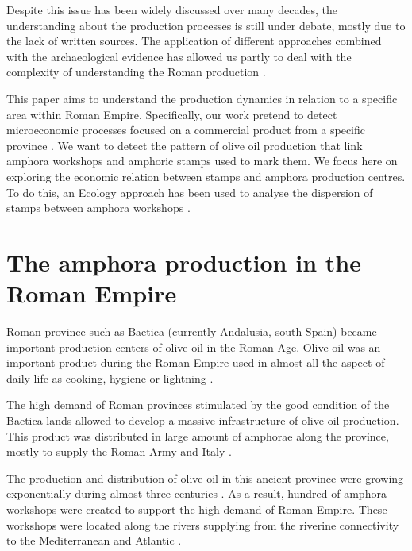 \documentclass[review]{elsarticle}
\begin{document}
Despite this issue has been widely discussed over many decades, the understanding about the production processes is still under debate, mostly due to the lack of written sources. The application of different approaches combined with the archaeological evidence has allowed us partly to deal with the complexity of understanding the Roman production \citep{orengo_seeds_2016,brughmans_roman_2016,coto-sarmiento_maria_bayesian_????}.

This paper aims to understand the production dynamics in relation to a specific area within Roman Empire. Specifically, our work pretend to detect microeconomic processes focused on a commercial product from a specific province \citep{isaksen_network_2006}. We want to detect the pattern of olive oil production that link amphora workshops and amphoric stamps used to mark them. We focus here on exploring the economic relation between stamps and amphora production centres. To do this, an Ecology approach has been used to analyse the dispersion of stamps between amphora workshops \citep{rubio-campillo_ecology_2018}. 



 


\section{The amphora production in the Roman Empire}

Roman province such as Baetica (currently Andalusia, south Spain) became important production centers of olive oil in the Roman Age. Olive oil was an important product during the Roman Empire used in almost all the aspect of daily life as cooking, hygiene or lightning \citep{mattingly_d.j._oil_1988}. 

The high demand of Roman provinces stimulated by the good condition of the Baetica lands allowed to develop a massive infrastructure of olive oil production. This product was distributed in large amount of amphorae along the province, mostly to supply the Roman Army and Italy \citep{blazquez_exportacion_1980}. 

The production and distribution of olive oil in this ancient province were growing exponentially during almost three centuries \citep{remesal_concierto}. As a result, hundred of amphora workshops were created to support the high demand of Roman Empire. These workshops were located along the rivers supplying from the riverine connectivity to the Mediterranean and Atlantic \citep{garcia_vargas_enrique_formal_2010}. 
\end{document}
